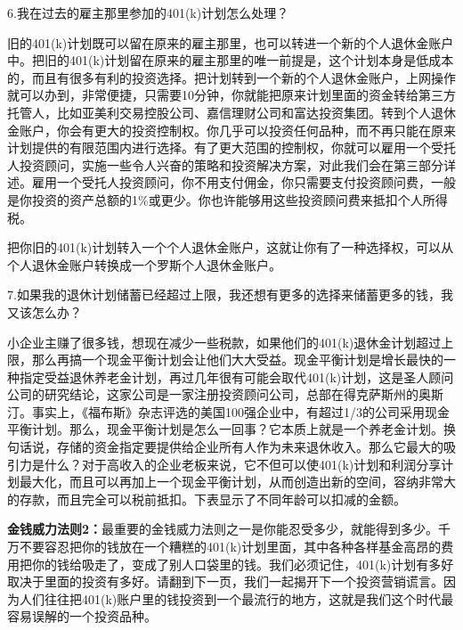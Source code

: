 6.我在过去的雇主那里参加的401(k)计划怎么处理？

旧的401(k)计划既可以留在原来的雇主那里，也可以转进一个新的个人退休金账户中。把旧的401(k)计划留在原来的雇主那里的唯一前提是，这个计划本身是低成本的，而且有很多有利的投资选择。把计划转到一个新的个人退休金账户，上网操作就可以办到，非常便捷，只需要10分钟，你就能把原来计划里面的资金转给第三方托管人，比如亚美利交易控股公司、嘉信理财公司和富达投资集团。转到个人退休金账户，你会有更大的投资控制权。你几乎可以投资任何品种，而不再只能在原来计划提供的有限范围内进行选择。有了更大范围的控制权，你就可以雇用一个受托人投资顾问，实施一些令人兴奋的策略和投资解决方案，对此我们会在第三部分详述。雇用一个受托人投资顾问，你不用支付佣金，你只需要支付投资顾问费，一般是你投资的资产总额的1\%或更少。你也许能够用这些投资顾问费来抵扣个人所得税。

把你旧的401(k)计划转入一个个人退休金账户，这就让你有了一种选择权，可以从个人退休金账户转换成一个罗斯个人退休金账户。

7.如果我的退休计划储蓄已经超过上限，我还想有更多的选择来储蓄更多的钱，我又该怎么办？

小企业主赚了很多钱，想现在减少一些税款，如果他们的401(k)退休金计划超过上限，那么再搞一个现金平衡计划会让他们大大受益。现金平衡计划是增长最快的一种指定受益退休养老金计划，再过几年很有可能会取代401(k)计划，这是圣人顾问公司的研究结论，这家公司是一家注册投资顾问公司，总部在得克萨斯州的奥斯汀。事实上，《福布斯》杂志评选的美国100强企业中，有超过1/3的公司采用现金平衡计划。那么，现金平衡计划是怎么一回事？它本质上就是一个养老金计划。换句话说，存储的资金指定要提供给企业所有人作为未来退休收入。那么它最大的吸引力是什么？对于高收入的企业老板来说，它不但可以使401(k)计划和利润分享计划最大化，而且可以再加上一个现金平衡计划，从而创造出新的空间，容纳非常大的存款，而且完全可以税前抵扣。下表显示了不同年龄可以扣减的金额。



\textbf{金钱威力法则2：}最重要的金钱威力法则之一是你能忍受多少，就能得到多少。千万不要容忍把你的钱放在一个糟糕的401(k)计划里面，其中各种各样基金高昂的费用把你的钱给吸走了，变成了别人口袋里的钱。我们必须记住，401(k)计划有多好取决于里面的投资有多好。请翻到下一页，我们一起揭开下一个投资营销谎言。因为人们往往把401(k)账户里的钱投资到一个最流行的地方，这就是我们这个时代最容易误解的一个投资品种。
